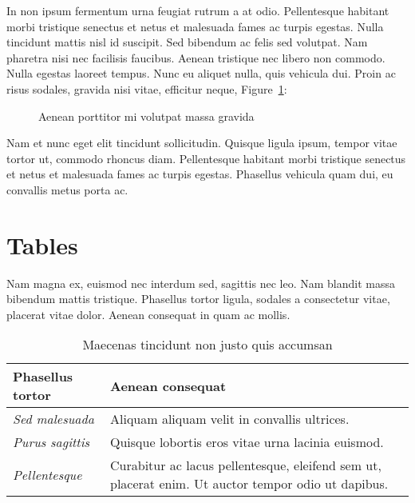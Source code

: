 In non ipsum fermentum urna feugiat rutrum a at odio. Pellentesque habitant morbi tristique senectus et netus et malesuada fames ac turpis egestas. Nulla tincidunt mattis nisl id suscipit. Sed bibendum ac felis sed volutpat. Nam pharetra nisi nec facilisis faucibus. Aenean tristique nec libero non commodo. Nulla egestas laoreet tempus. Nunc eu aliquet nulla, quis vehicula dui. Proin ac risus sodales, gravida nisi vitae, efficitur neque, Figure~\ref{fig:example-2}:

\begin{figure}[H]
	\centering
	\hspace{5pt}
	\caption{Aenean porttitor mi volutpat massa gravida}
	\label{fig:example-2}
\end{figure}

Nam et nunc eget elit tincidunt sollicitudin. Quisque ligula ipsum, tempor vitae tortor ut, commodo rhoncus diam. Pellentesque habitant morbi tristique senectus et netus et malesuada fames ac turpis egestas. Phasellus vehicula quam dui, eu convallis metus porta ac.


\section{Tables}

Nam magna ex, euismod nec interdum sed, sagittis nec leo. Nam blandit massa bibendum mattis tristique. Phasellus tortor ligula, sodales a consectetur vitae, placerat vitae dolor. Aenean consequat in quam ac mollis. 

\begin{table}[H]
	\centering
	\begin{tabular}{ | m{} | m{} | }
		\hline
		\textbf{Phasellus tortor} & \textbf{Aenean consequat} \\
		\hline \hline
		\emph{Sed malesuada} & Aliquam aliquam velit in convallis ultrices. \\
		\hline
		\emph{Purus sagittis} &  Quisque lobortis eros vitae urna lacinia euismod. \\
		\hline
		\emph{Pellentesque} & Curabitur ac lacus pellentesque, eleifend sem ut, placerat enim. Ut auctor tempor odio ut dapibus. \\
		\hline
	\end{tabular}
	\caption{Maecenas tincidunt non justo quis accumsan}
	\label{tab:example-1}
\end{table}

